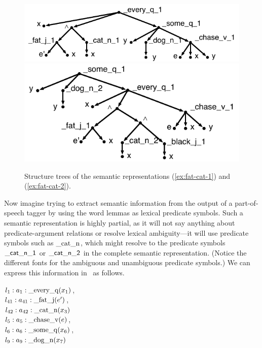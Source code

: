 \begin{figure}[t]
\centering
\includegraphics[scale=0.8]{pic-cat-chased-dog} \\
\includegraphics[scale=0.8]{pic-cat-chased-dog-2}
\caption{Structure trees of the semantic representations (\ref{ex:fat-cat-1}) and
  (\ref{ex:fat-cat-2}). \label{fig:1}}
\end{figure}


Now imagine trying to extract semantic information from
the output of a part-of-speech tagger by using the word lemmas as
lexical predicate symbols.  Such a semantic representation is highly
partial, as it will not say anything about predicate-argument
relations or resolve lexical ambiguity---it will use predicate
symbols such as $\mathrm{\_cat\_n}$, which might resolve to the
predicate symbols $\mathsf{\_cat\_n\_1}$ or $\mathsf{\_cat\_n\_2}$ in the
complete semantic representation.  (Notice the different
fonts for the ambiguous and unambiguous predicate symbols.)  
We can
express this information in \rmrs\ as follows.

\begin{examples}
\item \label{ex:cat-pos}
$l_1:a_1:\mathrm{\_every\_q}(x_1)$, \\
$l_{41}:a_{41}:\mathrm{\_fat\_j}(e')$,\\
$l_{42}:a_{42}:\mathrm{\_cat\_n}(x_3)$\\
$l_5:a_5:\mathrm{\_chase\_v}(e)$, \\
$l_6:a_6:\mathrm{\_some\_q}(x_6)$, \\
$l_9:a_9:\mathrm{\_dog\_n}(x_7)$
\end{examples}

